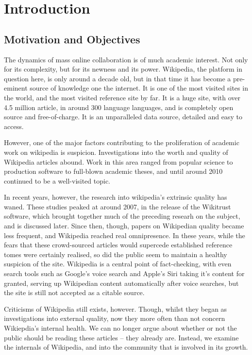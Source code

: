 \chapter{Introduction}

\section{Motivation and Objectives}

The dynamics of mass online collaboration is of much academic
interest. Not only for its complexity, but for its newness and its
power. Wikipedia, the platform in question here, is only around a
decade old, but in that time it has become a pre-eminent source of
knowledge one the internet. It is one of the most visited sites in the
world, and the most visited reference site by far. It is a huge site,
with over 4.5 million article, in around 300 language languages, and
is completely open source and free-of-charge. It is an unparalleled
data source, detailed and easy to access.

However, one of the major factors contributing to the proliferation of
academic work on wikipedia is suspicion. Investigations into the worth
and quality of Wikipedia articles abound. Work in this area ranged
from popular science to production software to full-blown academic
theses, and until around 2010 continued to be a well-visited topic.

In recent years, however, the research into wikipedia's extrinsic
quality has waned. These studies peaked at around 2007, in the release
of the Wikitrust software, which brought together much of the
preceding researh on the subject, and is discussed later. Since then,
though, papers on Wikipedian quality became less frequent, and
Wikipedia reached real omnipresence.  In these years, while the fears
that these crowd-sourced articles would supercede established
reference tomes were certainly realised, so did the public seem to
maintain a healthy suspicion of the site. Wikipedia is a central point
of fact-checking, with even search tools such as Google's voice search
and Apple's Siri taking it's content for granted, serving up
Wikipedian content automatically after voice searches, but the site is
still not accepted as a citable source.

Criticisms of Wikipedia still exists, however. Though, whilst they
began as investigations into external quality, now they more often
than not concern Wikiepdia's internal health. We can no longer argue
about whether or not the public should be reading these articles --
they already are. Instead, we examine the internals of Wikipedia, and
into the community that is involved in its growth. 

